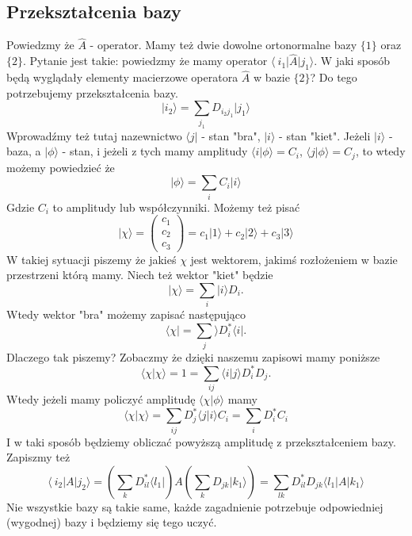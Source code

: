 \subsection{Przekształcenia bazy}
Powiedzmy że $\hat{A}$ - operator. Mamy też dwie dowolne ortonormalne bazy $\{1\}$ oraz $\{2\}$. Pytanie jest takie: powiedzmy że mamy operator $\langle\ i_1 \vert \hat{A} \vert j_1 \rangle$. W jaki sposób będą wyglądały elementy macierzowe operatora $\hat{A}$ w bazie $\{2\}$? Do tego potrzebujemy przekształcenia bazy.
\begin{equation*}
	\vert i_2 \rangle = \sum_{j_1} D_{i_2 j_1} \vert j_1 \rangle 
\end{equation*}
Wprowadźmy też tutaj nazewnictwo $\langle j \vert$ - stan "bra", $\vert i \rangle$ - stan "kiet".
Jeżeli ${\vert i \rangle}$ - baza, a $\vert \phi \rangle$ - stan, i jeżeli z tych mamy amplitudy $\langle i \vert \phi \rangle = C_i$, $\langle j \vert \phi \rangle = C_j$, to wtedy możemy powiedzieć że
\begin{equation*}
	\vert \phi \rangle = \sum_{i} C_i \vert i \rangle 
\end{equation*}
Gdzie $C_i$ to amplitudy lub współczynniki. Możemy też pisać
\begin{equation*}
	\vert \chi \rangle = \begin{pmatrix} c_1 \\ c_2 \\ c_3 \end{pmatrix} = c_1 \vert 1 \rangle + c_2 \vert 2 \rangle + c_3 \vert 3 \rangle 
\end{equation*}
W takiej sytuacji piszemy że jakieś $\chi$ jest wektorem, jakimś rozłożeniem w bazie przestrzeni którą mamy. 
Niech też wektor "kiet" będzie 
\begin{equation*}
	\vert \chi \rangle = \sum_i \vert i \rangle D_i.
\end{equation*}
Wtedy wektor "bra" możemy zapisać następująco
\begin{equation*}
	\langle \chi \vert = \sum_j \rangle D_i^* \langle i \vert.
\end{equation*}
Dlaczego tak piszemy? Zobaczmy że dzięki naszemu zapisowi mamy poniższe
\begin{equation*}
	\langle \chi \vert \chi \rangle =  1 = \sum_{ij} \langle i \vert j \rangle D_i^* D_j.
\end{equation*}
Wtedy jeżeli mamy policzyć amplitudę $\langle \chi \vert \phi \rangle$ mamy
\begin{equation*}
	\langle \chi \vert \chi \rangle = \sum_{ij} D_j^* \langle j \vert i \rangle C_i = \sum_i D_i^* C_i
\end{equation*}
I w taki sposób będziemy obliczać powyższą amplitudę z przekształceniem bazy. Zapiszmy też
\begin{equation*}
	\langle\ i_2 \vert A \vert j_2 \rangle = \left(\sum_k D_{il}^* \langle l_1 \vert  \right) A \left(\sum_k D_{jk} \vert k_1 \rangle \right) = \sum_{lk} D_{il}^* D_{jk} \langle l_1 \vert A \vert k_1 \rangle
\end{equation*}
Nie wszystkie bazy są takie same, każde zagadnienie potrzebuje odpowiedniej (wygodnej) bazy i będziemy się tego uczyć.
